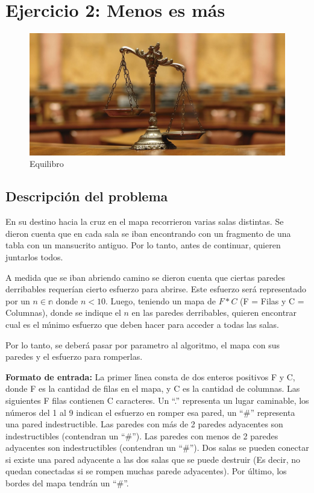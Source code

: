 
\section{Ejercicio 2: Menos es más}

	\begin{figure}[ht]
		\begin{center}
			\includegraphics[width=0.5\columnwidth]{imagenes/balanza.jpg}
			\caption{Equilibro}
		\end{center}
	\end{figure}

	\subsection{Descripción del problema}
	En su destino hacia la cruz en el mapa recorrieron varias salas distintas. Se dieron cuenta que en cada sala se iban encontrando con un fragmento de una tabla con un mansucrito antiguo. Por lo tanto, antes de continuar, quieren juntarlos todos.\par
	A medida que se iban abriendo camino se dieron cuenta que ciertas paredes derribables requerían cierto esfuerzo para
	abrirse. Este esfuerzo será representado por un $n\in{\mathbb{n}}$ donde $n < 10$. Luego, teniendo un mapa de $F*C$ (F = Filas y C = Columnas), donde se indique el $n$ en las paredes derribables, quieren encontrar cual es el mı́nimo esfuerzo que deben hacer para acceder a todas las salas. \par

	Por lo tanto, se deberá pasar por parametro al algoritmo, el mapa con sus paredes y el esfuerzo para romperlas. 
	\newline
	~

	\textbf{Formato de entrada:} La primer lı́nea consta de dos enteros positivos F y C, donde F es la cantidad de filas en el mapa, y C es la cantidad de columnas. Las siguientes F filas contienen C caracteres. Un “.” representa un lugar caminable, los números del 1 al 9 indican el esfuerzo en romper esa pared, un “\#” representa una pared indestructible. Las paredes con más de 2 paredes adyacentes son indestructibles (contendran un “\#”). Las paredes con menos de 2 paredes adyacentes son indestructibles (contendran un “\#”). Dos salas se pueden conectar si existe una pared adyacente a las dos salas que se puede destruir (Es decir, no quedan conectadas si se rompen muchas parede adyacentes). Por último, los bordes del mapa tendrán un “\#”.


